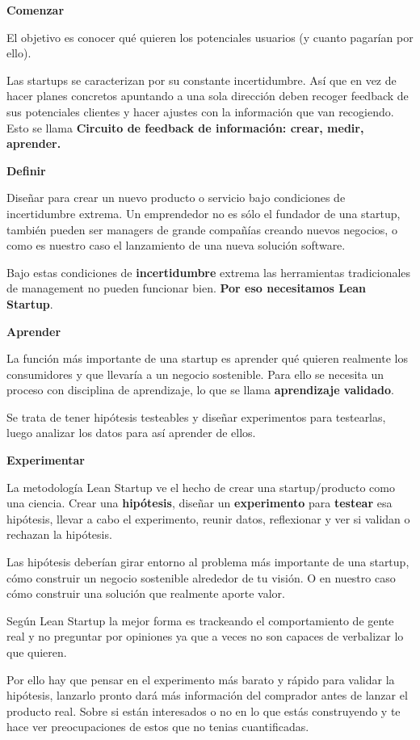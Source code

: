 \documentclass[12pt,twoside,titlepage]{report}
\begin{document}
\textbf{Comenzar}

El objetivo es conocer qué quieren los potenciales usuarios (y cuanto pagarían por ello). 

Las startups se caracterizan por su constante incertidumbre. Así que en vez de hacer planes concretos apuntando a una sola dirección deben recoger feedback de sus potenciales clientes y hacer ajustes con la información que van recogiendo. Esto se llama \textbf{Circuito de feedback de información: crear, medir, aprender.}

\textbf{Definir}

Diseñar para crear un nuevo producto o servicio bajo condiciones de incertidumbre extrema. Un emprendedor no es sólo el fundador de una startup, también pueden ser managers de grande compañías creando nuevos negocios, o como es nuestro caso el lanzamiento de una nueva solución software.

Bajo estas condiciones de \textbf{incertidumbre} extrema las herramientas tradicionales de management no pueden funcionar bien. \textbf{Por eso necesitamos Lean Startup}.

\textbf{Aprender}

La función más importante de una startup es aprender qué quieren realmente los consumidores y que llevaría a un negocio sostenible. Para ello se necesita un proceso con disciplina de aprendizaje, lo que se llama \textbf{aprendizaje validado}. 

Se trata de tener hipótesis testeables y diseñar experimentos para testearlas, luego analizar los datos para así aprender de ellos.

\textbf{Experimentar}

La metodología Lean Startup ve el hecho de crear una startup/producto como una ciencia. Crear una \textbf{hipótesis}, diseñar un \textbf{experimento} para \textbf{testear} esa hipótesis, llevar a cabo el experimento, reunir datos, reflexionar y ver si validan o rechazan la hipótesis.

Las hipótesis deberían girar entorno al problema más importante de una startup, cómo construir un negocio sostenible alrededor de tu visión. O en nuestro caso cómo construir una solución que realmente aporte valor.

Según Lean Startup la mejor forma es trackeando el comportamiento de gente real y no preguntar por opiniones ya que a veces no son capaces de verbalizar lo que quieren.

Por ello hay que pensar en el experimento más barato y rápido para validar la hipótesis, lanzarlo pronto dará más información del comprador antes de lanzar el producto real. Sobre si están interesados o no en lo que estás construyendo y te hace ver preocupaciones de estos que no tenias cuantificadas.
\end{document}
